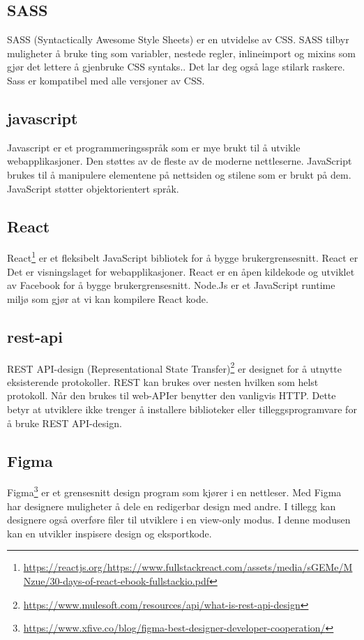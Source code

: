 \subsection{SASS}
SASS (Syntactically Awesome Style Sheets) er en utvidelse av CSS. SASS tilbyr muligheter å bruke ting som variabler, nestede regler, inlineimport og mixins som gjør det lettere å gjenbruke CSS syntaks.. Det lar deg også lage stilark raskere. Sass er kompatibel med alle versjoner av CSS.  

\subsection{javascript}
Javascript er et programmeringsspråk som er mye brukt til å utvikle webapplikasjoner. Den støttes av de fleste av de moderne nettleserne. JavaScript brukes til å manipulere elementene på nettsiden og stilene som er brukt på dem. JavaScript støtter objektorientert språk.

\subsection{React}
React\footnote{\url{https://reactjs.org/}\url{https://www.fullstackreact.com/assets/media/sGEMe/MNzue/30-days-of-react-ebook-fullstackio.pdf}} er et fleksibelt JavaScript bibliotek for å bygge brukergrensesnitt. React er Det er visningslaget for webapplikasjoner. React er en åpen kildekode og utviklet av Facebook for å bygge brukergrensesnitt. Node.Js er et JavaScript runtime miljø som gjør at vi kan kompilere React kode.

\subsection{rest-api}
REST API-design (Representational State Transfer)\footnote{\url{https://www.mulesoft.com/resources/api/what-is-rest-api-design}} er designet for å utnytte eksisterende protokoller. REST kan brukes over nesten hvilken som helst protokoll. Når den brukes til web-APIer benytter den vanligvis HTTP. Dette betyr at utviklere ikke trenger å installere biblioteker eller tilleggsprogramvare for å bruke REST API-design.

\subsection{Figma}
Figma\footnote{\url{https://www.xfive.co/blog/figma-best-designer-developer-cooperation/}} er et grensesnitt design program som kjører i en nettleser. Med Figma har designere muligheter å dele en redigerbar design med andre. I tillegg kan designere også overføre filer til utviklere i en view-only modus. I denne modusen kan en utvikler inspisere design og eksportkode.

